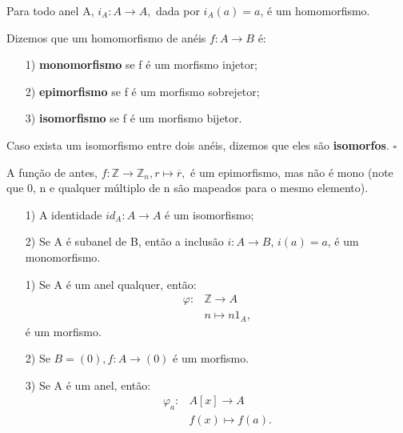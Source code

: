 \documentclass[AlgebraII/algebraII_notes.tex]{subfiles}
\begin{document}
\begin{example}
	Para todo anel A, \(i_{A}:A\rightarrow A,\) dada por \(i_{A}(a) = a\), é um homomorfismo.
\end{example}
\begin{def*}
	Dizemos que um homomorfismo de anéis \(f:A\rightarrow B\) é:
	\begin{itemize}
		\item[1)] \textbf{monomorfismo} se f é um morfismo injetor;
		\item[2)] \textbf{epimorfismo} se f é um morfismo sobrejetor;
		\item[3)] \textbf{isomorfismo} se f é um morfismo bijetor.
	\end{itemize}
	Caso exista um isomorfismo entre dois anéis, dizemos que eles são \textbf{isomorfos}. \(\square\)
\end{def*}
\begin{example}
	A função de antes, \(f:\mathbb{Z}\rightarrow \mathbb{Z}_{n}, r \mapsto \overline{r},\) é um epimorfismo, mas não é mono (note que 0, n e qualquer múltiplo de n
	são mapeados para o mesmo elemento).
\end{example}
\begin{prop*}[Exercício]
	\begin{itemize}
		\item[1)] A identidade \(id_{A}:A\rightarrow A\) é um isomorfismo;
		\item[2)] Se A é subanel de B, então a inclusão \(i:A\rightarrow B\), \(i(a) = a\), é
		      um monomorfismo.
	\end{itemize}
\end{prop*}
\begin{example}[Exercício]
	\begin{itemize}
		\item[1)] Se A é um anel qualquer, então:
		      \begin{align*}
			      \varphi: & \mathbb{Z}\rightarrow A \\
			               & n\mapsto n1_{A},
		      \end{align*}
		      é um morfismo.
		\item[2)] Se \(B=(0), f:A\rightarrow (0)\) é um morfismo.
		\item[3)] Se A é um anel, então:
		      \begin{align*}
			      \varphi_{a}: & A[x]\rightarrow A \\
			                   & f(x)\mapsto f(a).
		      \end{align*}
	\end{itemize}
\end{example}
\end{document}
